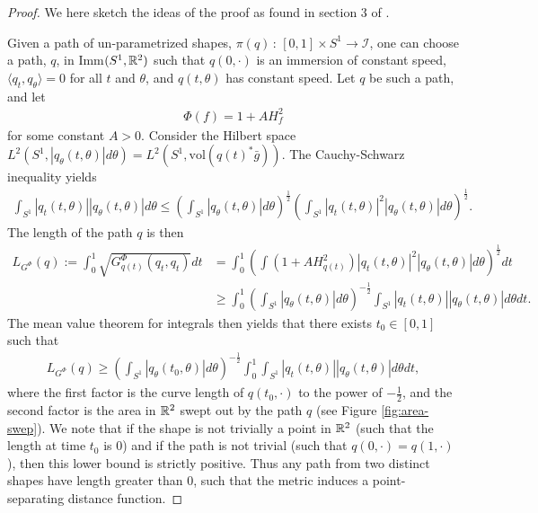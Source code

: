 \begin{proof}
We here sketch the ideas of the proof as found in section 3 of \cite{michor2003riemannian}.

Given a path of un-parametrized shapes, $\pi(q) \, : \, [0,1] \times S^1 \rightarrow \mathcal{I}$, one can choose a path, $q$, in Imm$(S^1, \mathbb{R}^2)$ such that $q(0, \cdot)$ is an immersion of constant speed, $\langle q_t, q_\theta \rangle = 0$ for all $t$ and $\theta$, and $q(t , \theta)$ has constant speed. Let $q$ be such a path, and let
\begin{align*}
\Phi(f) = 1 + A H_f ^2
\end{align*}
for some constant $A > 0$. Consider the Hilbert space $L^2(S^1, \left| q_\theta(t, \theta) \right| d\theta) = L^2(S^1, \text{vol} (q(t)^* \bar{g}))$. The Cauchy-Schwarz inequality yields
\begin{align*}
\int_{S^1} \left| q_t(t, \theta) \right| \left| q_\theta(t, \theta) \right| d \theta \leq \left(\int_{S^1} \left| q_\theta(t, \theta) \right| d \theta \right) ^{\frac{1}{2}} \left( \int_{S^1} \left| q_t(t, \theta) \right|^2 \left| q_\theta(t, \theta) \right| d \theta   \right) ^{\frac{1}{2}}.
\end{align*}
The length of the path $q$ is then
\begin{align*}
L_{G^{\Phi}}(q) := \int_0^1  \sqrt{G^{\Phi}_{q(t)}(q_t, q_t)} dt &= \int_0^1 \left( \int (1 + AH_{q(t)}^2 ) \left| q_t(t, \theta) \right|^2 \left| q_\theta(t, \theta) \right| d\theta     \right) ^{\frac{1}{2}} dt \\
& \geq \int_0^1 \left(\int_{S^1} \left| q_\theta(t, \theta) \right| d \theta \right) ^{-\frac{1}{2}} \int_{S^1} \left| q_t(t, \theta) \right| \left| q_\theta(t, \theta) \right| d \theta dt.
\end{align*}
The mean value theorem for integrals then yields that there exists $t_0 \in [0, 1]$ such that
\begin{align*}
L_{G^{\Phi}}(q)\geq  \left(\int_{S^1} \left| q_\theta(t_0, \theta) \right| d \theta \right) ^{-\frac{1}{2}} \int_0^1 \int_{S^1} \left| q_t(t, \theta) \right| \left| q_\theta(t, \theta) \right| d \theta dt,
\end{align*}
where the first factor is the curve length of $q(t_0, \cdot)$ to the power of $-\frac{1}{2}$, and the second factor is the area in $\mathbb{R}^2$ swept out by the path $q$ (see Figure \ref{fig:area-swep}). We note that if the shape is not trivially a point in $\mathbb{R}^2$ (such that the length at time $t_0$ is $0$) and if the path is not trivial (such that $q(0, \cdot) = q(1, \cdot)$), then this lower bound is strictly positive. Thus any path from two distinct shapes have length greater than $0$, such that the metric induces a point-separating distance function.
\end{proof}

